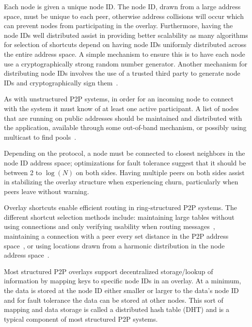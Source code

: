 \documentclass[conference]{IEEEtran}
\begin{document}
Each node is given a unique node ID.  The node ID, drawn from a large address space, must be unique to each peer,
otherwise address collisions will occur which can prevent nodes from participating
in the overlay.  Furthermore, having the node IDs well distributed assist in
providing better scalability as many algorithms for selection of shortcuts
depend on having node IDs uniformly distributed across the entire address space.
A simple mechanism to ensure this is to have each node use a cryptographically
strong random number generator.  Another mechanism for distributing node IDs
involves the use of a trusted third party to generate node IDs and
cryptographically sign them~\cite{secure_routing}.

As with unstructured P2P systems, in order for an incoming node to connect with
the system it must know of at least one active participant.  A list of nodes
that are running on public addresses should be maintained and distributed with
the application, available through some out-of-band mechanism, or possibly using
multicast to find pools~\cite{pastry}.

Depending on the protocol, a node must be connected to closest
neighbors in the node ID address space; optimizations for fault tolerance suggest
that it should be between 2 to $\log(N)$ on both sides.  
Having multiple peers on both sides assist in stabilizing the overlay structure
when experiencing churn, particularly when peers leave without warning.

Overlay shortcuts enable efficient routing in ring-structured P2P systems.  The
different shortcut selection methods include: maintaining large tables without
using connections and only verifying usability when routing
messages~\cite{pastry, kademlia}, maintaining a connection with a peer every
set distance in the P2P address space~\cite{chord}, or using locations drawn
from a harmonic distribution in the node address space~\cite{symphony}.

Most structured P2P overlays support decentralized storage/lookup of information by
mapping keys to specific node IDs in an overlay.  At a minimum, the data is stored
at the node ID either smaller or larger to the data's node ID and for fault
tolerance the data can be stored at other nodes.  This sort of mapping
and data storage is called a distributed hash table (DHT) and is a typical
component of most structured P2P systems.
\end{document}
